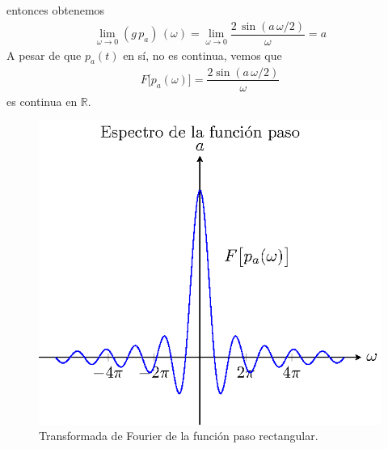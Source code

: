 entonces obtenemos 
\begin{align*}
\lim_{\omega \to 0}  (g \, p_{a}) \, (\omega) = \lim_{\omega \to 0} \dfrac{2 \, \sin (a \, \omega /2)}{\omega} = a
\end{align*}
A pesar de que $p_{a}(t)$ en sí, no es continua, vemos que
\begin{align}
F \big[p_{a}(\omega)\big] = \dfrac{2 \sin (a \, \omega/2)}{\omega}
\label{eq:ecuacion_06_11_Beerends}
\end{align}
es continua en $\mathbb{R}$.
\begin{figure}[H]
    \centering
    \includegraphics[scale=1]{Imagenes/T_Funcionpaso.eps}
    \caption{Transformada de Fourier de la función paso rectangular.}
    \label{fig:figura_Tfuncionpaso}
\end{figure}
%     

